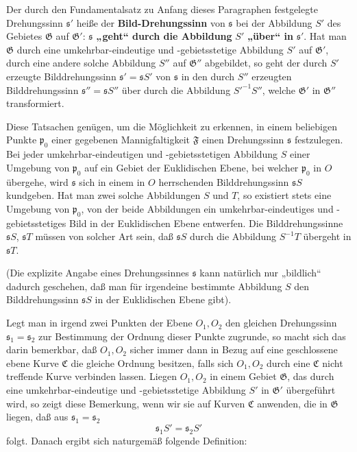 \documentclass{article}
\begin{document}
Der durch den Fundamentalsatz zu Anfang dieses Paragraphen festgelegte Drehungssinn $\mathfrak{s}'$ heiße der \textbf{Bild-Drehungssinn} von $\mathfrak{s}$ bei der Abbildung $S'$ des Gebietes $\mathfrak{G}$ auf $\mathfrak{G}'$: $\mathfrak{s}$ \textbf{„geht“ durch die Abbildung} $S'$ \textbf{„über“ in} $\mathfrak{s}'$. Hat man $\mathfrak{G}$ durch eine umkehrbar-eindeutige und -gebietsstetige Abbildung $S'$ auf $\mathfrak{G}'$, durch eine andere solche Abbildung $S''$ auf $\mathfrak{G}''$ abgebildet, so geht der durch $S'$ erzeugte Bilddrehungssinn $\mathfrak{s}' = \mathfrak{s} S'$ von $\mathfrak{s}$ in den durch $S''$ erzeugten Bilddrehungssinn $\mathfrak{s}'' = \mathfrak{s} S''$ über durch die Abbildung $S'^{-1} S''$, welche $\mathfrak{G}'$ in $\mathfrak{G}''$ transformiert.

Diese Tatsachen genügen, um die Möglichkeit zu erkennen, in einem beliebigen Punkte $\mathfrak{p}_0$ einer gegebenen Mannigfaltigkeit $\mathfrak{F}$ einen Drehungssinn $\mathfrak{s}$ festzulegen. Bei jeder umkehrbar-eindeutigen und -gebietsstetigen Abbildung $S$ einer Umgebung von $\mathfrak{p}_0$ auf ein Gebiet der Euklidischen Ebene, bei welcher $\mathfrak{p}_0$ in $O$ übergehe, wird $\mathfrak{s}$ sich in einem in $O$ herrschenden Bilddrehungssinn $\mathfrak{s} S$ kundgeben. Hat man zwei solche Abbildungen $S$ und $T$, so existiert stets eine Umgebung von $\mathfrak{p}_0$, von der beide Abbildungen ein umkehrbar-eindeutiges und -gebietsstetiges Bild in der Euklidischen Ebene entwerfen. Die Bilddrehungssinne $\mathfrak{s} S$, $\mathfrak{s} T$ müssen von solcher Art sein, daß $\mathfrak{s} S$ durch die Abbildung $S^{-1} T$ übergeht in $\mathfrak{s} T$.

(Die explizite Angabe eines Drehungssinnes $\mathfrak{s}$ kann natürlich nur „bildlich“ dadurch geschehen, daß man für irgendeine bestimmte Abbildung $S$ den Bilddrehungssinn $\mathfrak{s} S$ in der Euklidischen Ebene gibt).

Legt man in irgend zwei Punkten der Ebene $O_1, O_2$ den gleichen Drehungssinn $\mathfrak{s}_1 = \mathfrak{s}_2$ zur Bestimmung der Ordnung dieser Punkte zugrunde, so macht sich das darin bemerkbar, daß $O_1, O_2$ sicher immer dann in Bezug auf eine geschlossene ebene Kurve $\mathfrak{C}$ die gleiche Ordnung besitzen, falls sich $O_1, O_2$ durch eine $\mathfrak{C}$ nicht treffende Kurve verbinden lassen. Liegen $O_1, O_2$ in einem Gebiet $\mathfrak{G}$, das durch eine umkehrbar-eindeutige und -gebietsstetige Abbildung $S'$ in $\mathfrak{G}'$ übergeführt wird, so zeigt diese Bemerkung, wenn wir sie auf Kurven $\mathfrak{C}$ anwenden, die in $\mathfrak{G}$ liegen, daß aus $\mathfrak{s}_1 = \mathfrak{s}_2$
\[ \mathfrak{s}_1 S' = \mathfrak{s}_2 S' \]
folgt. Danach ergibt sich naturgemäß folgende Definition:
\end{document}
